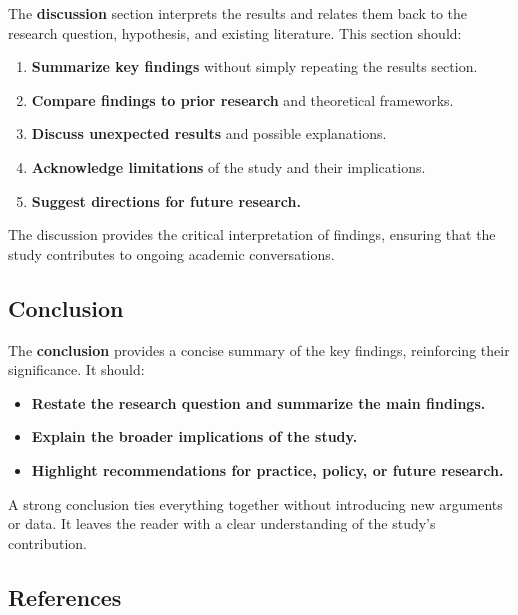 \documentclass[
]{book}
\providecommand{\tightlist}{%
  \setlength{\itemsep}{0pt}\setlength{\parskip}{0pt}}
\begin{document}
The \textbf{discussion} section interprets the results and relates them back to the research question, hypothesis, and existing literature. This section should:

\begin{enumerate}
\def\labelenumi{\arabic{enumi}.}
\tightlist
\item
  \textbf{Summarize key findings} without simply repeating the results section.
\item
  \textbf{Compare findings to prior research} and theoretical frameworks.
\item
  \textbf{Discuss unexpected results} and possible explanations.
\item
  \textbf{Acknowledge limitations} of the study and their implications.
\item
  \textbf{Suggest directions for future research.}
\end{enumerate}

The discussion provides the critical interpretation of findings, ensuring that the study contributes to ongoing academic conversations.

\subsection*{Conclusion}\label{conclusion}

The \textbf{conclusion} provides a concise summary of the key findings, reinforcing their significance. It should:

\begin{itemize}
\tightlist
\item
  \textbf{Restate the research question and summarize the main findings.}
\item
  \textbf{Explain the broader implications of the study.}
\item
  \textbf{Highlight recommendations for practice, policy, or future research.}
\end{itemize}

A strong conclusion ties everything together without introducing new arguments or data. It leaves the reader with a clear understanding of the study's contribution.

\subsection*{References}\label{references}
\end{document}
